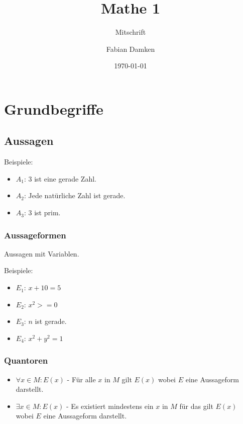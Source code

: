 \documentclass[12pt]{scrreprt}
\title{Mathe 1}
\subtitle{Mitschrift}
\author{Fabian Damken}
\date{\today}
\begin{document}
    \maketitle
    \tableofcontents

    \chapter{Grundbegriffe}
        \label{c:grundbegriffe}

        \section{Aussagen}
            \label{s:grundbegriffe_aussagen}

            Beispiele:
            \begin{itemize}
                \item $ A _ 1 $: $ 3 $ ist eine gerade Zahl.
                \item $ A _ 2 $: Jede natürliche Zahl ist gerade.
                \item $ A _ 3 $: $ 3 $ ist prim.
            \end{itemize}


            \subsection{Aussageformen}
                \label{ss:grundbegriffe_aussagen_formen}

                Aussagen mit Variablen.

                Beispiele:
                \begin{itemize}
                    \item $ E _ 1 $: $ x + 10 = 5 $
                    \item $ E _ 2 $: $ x ^ { 2 } >= 0 $ 
                    \item $ E _ 3 $: $ n $ ist gerade.
                    \item $ E _ 4 $: $ x ^ { 2 } + y ^ { 2 } = 1 $
                \end{itemize}


            \subsection{Quantoren}
                \label{ss:grundbegriffe_aussagen_quantoren}

                \begin{itemize}
                    \item $ \forall x \in M : E(x) $ - Für alle $ x $ in $ M $ gilt $ E(x) $ wobei $ E $ eine Aussageform darstellt.
                    \item $ \exists x \in M : E(x) $ - Es existiert mindestens ein $ x $ in $ M $ für das gilt $ E(x) $ wobei $ E $ eine Aussageform darstellt.
                \end{itemize}
\end{document}
